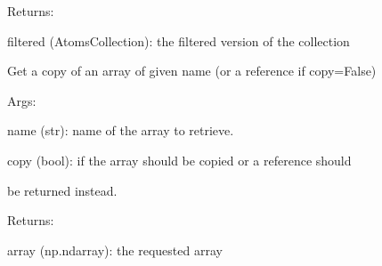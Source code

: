 \documentclass[letterpaper,10pt,english]{sphinxmanual}
\begin{document}
\begin{fulllineitems}
\begin{fulllineitems}
\begin{DUlineblock}{0em}
\item[] Returns:
\item[]
\begin{DUlineblock}{\DUlineblockindent}
\item[] filtered (AtomsCollection): the filtered version of the collection
\end{DUlineblock}
\end{DUlineblock}

\end{fulllineitems}


\begin{fulllineitems}
\label{doctree/soprano.collection.collection:soprano.collection.collection.AtomsCollection.get_array}
Get a copy of an array of given name (or a reference if copy=False)

\begin{DUlineblock}{0em}
\item[] Args:
\item[]
\begin{DUlineblock}{\DUlineblockindent}
\item[] name (str): name of the array to retrieve.
\item[] copy (bool): if the array should be copied or a reference should
\item[]
\begin{DUlineblock}{\DUlineblockindent}
\item[] be returned instead.
\end{DUlineblock}
\end{DUlineblock}
\end{DUlineblock}

\begin{DUlineblock}{0em}
\item[] Returns:
\item[]
\begin{DUlineblock}{\DUlineblockindent}
\item[] array (np.ndarray): the requested array
\end{DUlineblock}
\end{DUlineblock}

\end{fulllineitems}



\end{fulllineitems}
\end{document}

